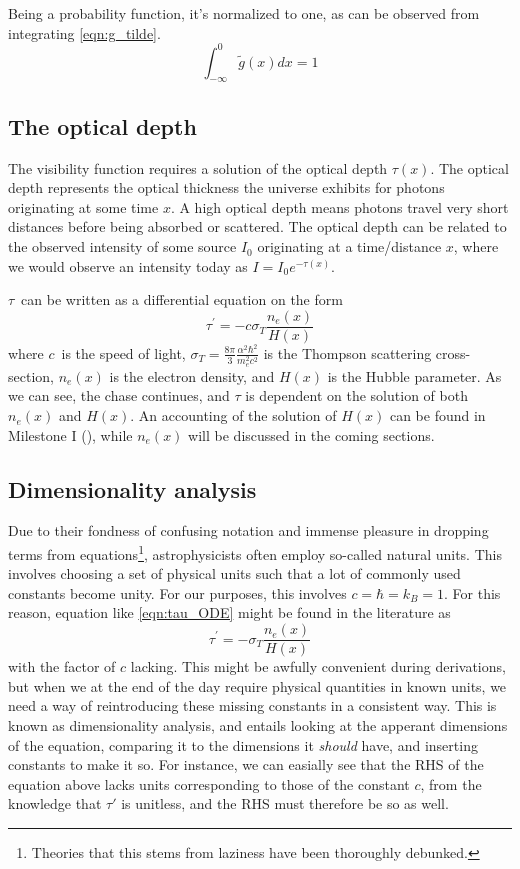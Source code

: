 \documentclass[10pt, a4paper]{article}
\renewcommand{\exp}{e^}
\renewcommand{\exp}{e^}
\begin{document}
Being a probability function, it's normalized to one, as can be observed from integrating \ref{eqn:g_tilde}.
\begin{equation}
    \int_{-\infty}^{0} \tilde{g}(x) d x = 1
\end{equation}


\subsection{The optical depth}
The visibility function requires a solution of the optical depth $\tau(x)$. The optical depth represents the optical thickness the universe exhibits for photons originating at some time $x$. A high optical depth means photons travel very short distances before being absorbed or scattered. The optical depth can be related to the observed intensity of some source $I_0$ originating at a time/distance $x$, where we would observe an intensity today as $I = I_0\exp{-\tau(x)}$.

$\tau$ can be written as a differential equation on the form
\begin{equation}\label{eqn:tau_ODE}
    \tau^\prime = - c \sigma_T\frac{n_{e}(x)}{H(x)}
\end{equation}
where $c$ is the speed of light, $\sigma_T = \frac{8 \pi}{3} \frac{\alpha^{2} \hbar^{2}}{m_{e}^{2} c^{2}}$ is the Thompson scattering cross-section, $n_e(x)$ is the electron density, and $H(x)$ is the Hubble parameter. As we can see, the chase continues, and $\tau$ is dependent on the solution of both $n_e(x)$ and $H(x)$. An accounting of the solution of $H(x)$ can be found in Milestone I (\cite{Milestone1}), while $n_e(x)$ will be discussed in the coming sections.


\subsection{Dimensionality analysis}
Due to their fondness of confusing notation and immense pleasure in dropping terms from equations\footnote{Theories that this stems from laziness have been thoroughly debunked.}, astrophysicists often employ so-called natural units. This involves choosing a set of physical units such that a lot of commonly used constants become unity. For our purposes, this involves $c = \hbar = k_B = 1$. For this reason, equation like \ref{eqn:tau_ODE} might be found in the literature as
\begin{equation*}
    \tau^\prime = - \sigma_T\frac{n_{e}(x)}{H(x)}
\end{equation*}
with the factor of $c$ lacking. This might be awfully convenient during derivations, but when we at the end of the day require physical quantities in known units, we need a way of reintroducing these missing constants in a consistent way. This is known as dimensionality analysis, and entails looking at the apperant dimensions of the equation, comparing it to the dimensions it \textit{should} have, and inserting constants to make it so. For instance, we can easially see that the RHS of the equation above lacks units corresponding to those of the constant $c$, from the knowledge that $\tau'$ is unitless, and the RHS must therefore be so as well.
\end{document}
